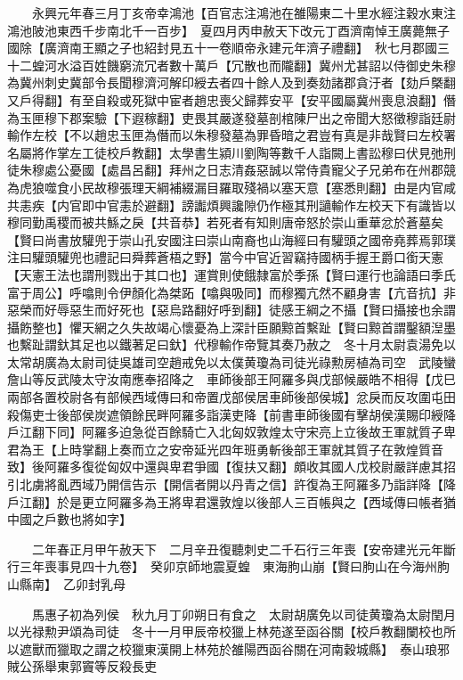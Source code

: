 　　永興元年春三月丁亥帝幸鴻池【百官志注鴻池在雒陽東二十里水經注穀水東注鴻池陂池東西千步南北千一百步】　夏四月丙申赦天下改元丁酉濟南悼王廣薨無子國除【廣濟南王顯之子也紹封見五十一卷順帝永建元年濟子禮翻】　秋七月郡國三十二蝗河水溢百姓饑窮流冗者數十萬戶【冗散也而隴翻】冀州尤甚詔以侍御史朱穆為冀州刺史冀部令長聞穆濟河解印綬去者四十餘人及到奏劾諸郡貪汙者【劾戶槩翻又戶得翻】有至自殺或死獄中宦者趙忠喪父歸葬安平【安平國屬冀州喪息浪翻】僭為玉匣穆下郡案驗【下遐稼翻】吏畏其嚴遂發墓剖棺陳尸出之帝聞大怒徵穆詣廷尉輸作左校【不以趙忠玉匣為僭而以朱穆發墓為罪昏暗之君豈有真是非哉賢曰左校署名屬將作掌左工徒校戶教翻】太學書生潁川劉陶等數千人詣闕上書訟穆曰伏見弛刑徒朱穆處公憂國【處昌呂翻】拜州之日志清姦惡誠以常侍貴寵父子兄弟布在州郡競為虎狼噬食小民故穆張理天綱補綴漏目羅取殘禍以塞天意【塞悉則翻】由是内官咸共恚疾【内官即中官恚於避翻】謗讟煩興讒隙仍作極其刑讁輸作左校天下有識皆以穆同勤禹稷而被共鯀之戾【共音恭】若死者有知則唐帝怒於崇山重華忿於蒼墓矣【賢曰尚書放驩兜于崇山孔安國注曰崇山南裔也山海經曰有驩頭之國帝堯葬焉郭璞注曰驩頭驩兜也禮記曰舜葬蒼梧之野】當今中官近習竊持國柄手握王爵口銜天憲【天憲王法也謂刑戮出于其口也】運賞則使餓隸富於季孫【賢曰運行也論語曰季氏富于周公】呼噏則令伊顏化為桀跖【噏與吸同】而穆獨亢然不顧身害【亢音抗】非惡榮而好辱惡生而好死也【惡烏路翻好呼到翻】徒感王綱之不攝【賢曰攝接也余謂攝飭整也】懼天網之久失故竭心懷憂為上深計臣願黥首繫趾【賢曰黥首謂鑿額湼墨也繫趾謂釱其足也以鐵著足曰釱】代穆輸作帝覽其奏乃赦之　冬十月太尉袁湯免以太常胡廣為太尉司徒吳雄司空趙戒免以太僕黄瓊為司徒光祿勲房植為司空　武陵蠻詹山等反武陵太守汝南應奉招降之　車師後部王阿羅多與戊部候嚴皓不相得【戊巳兩部各置校尉各有部候西域傳曰和帝置戊部侯居車師後部侯城】忿戾而反攻圍屯田殺傷吏士後部侯炭遮領餘民畔阿羅多詣漢吏降【前書車師後國有擊胡侯漢賜印綬降戶江翻下同】阿羅多迫急從百餘騎亡入北匈奴敦煌太守宋亮上立後故王軍就質子卑君為王【上時掌翻上奏而立之安帝延光四年班勇斬後部王軍就其質子在敦煌質音致】後阿羅多復從匈奴中還與卑君爭國【復扶又翻】頗收其國人戊校尉嚴詳慮其招引北虜將亂西域乃開信告示【開信者開以丹青之信】許復為王阿羅多乃詣詳降【降戶江翻】於是更立阿羅多為王將卑君還敦煌以後部人三百帳與之【西域傳曰帳者猶中國之戶數也將如字】

　　二年春正月甲午赦天下　二月辛丑復聽刺史二千石行三年喪【安帝建光元年斷行三年喪事見四十九卷】　癸卯京師地震夏蝗　東海朐山崩【賢曰朐山在今海州朐山縣南】　乙卯封乳母

　　馬惠子初為列侯　秋九月丁卯朔日有食之　太尉胡廣免以司徒黄瓊為太尉閏月以光禄勲尹頌為司徒　冬十一月甲辰帝校獵上林苑遂至函谷關【校戶教翻闌校也所以遮獸而獵取之謂之校獵東漢開上林苑於雒陽西函谷關在河南穀城縣】　泰山琅邪賊公孫舉東郭竇等反殺長吏

